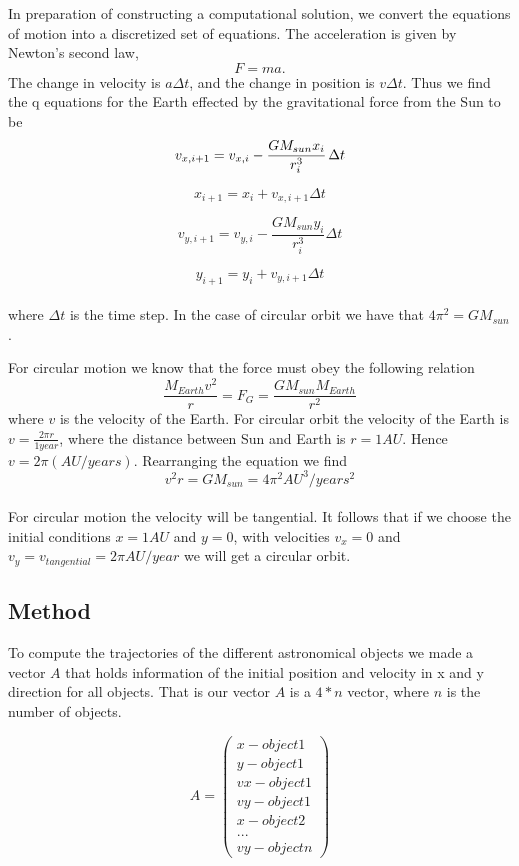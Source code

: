 \documentclass[a4paper,12pt, english]{article}
\begin{document}
In preparation of constructing a computational solution, we convert the equations of motion into a discretized set of equations. The acceleration is given by Newton's second law, $$ F = ma.$$ The change in velocity is $a \Delta t$, and the change in position is $v \Delta t$. Thus we find the q
equations for the Earth effected by the gravitational force from the Sun to be
\\

$$v_{x,i+1} = v_{x,i} - \frac{G M_{sun} x_i}{r_i ^3} \hspace{0.5mm} \Delta t $$ 

$$x_{i+1} = x_i + v_{x,i+1} \Delta t $$

$$v_{y,i+1} = v_{y,i} - \frac{G M_{sun} y_i}{r_i ^3} \Delta t $$

$$y_{i+1} = y_i + v_{y,i+1} \Delta t $$
\\

where $\Delta t$ is the time step. In the case of circular orbit we have that $4 \pi ^2 = GM_{sun}$.

For circular motion we know that the force must obey the following relation \\
$$\frac{M_{Earth}v^2}{r} = F_G = \frac{GM_{sun}M_{Earth}}{r^2}$$ where $v$ is the velocity of the Earth. 
For circular orbit the velocity of the Earth is $v = \frac{2 \pi r}{1 year}$, where the distance between Sun and Earth is $r = 1 AU$. Hence $v = 2 \pi (AU/years)$. Rearranging the equation we find\\
$$v^2r = GM_{sun} = 4 \pi ^2 AU^3/years^2$$
\\
For circular motion the velocity will be tangential. It follows that if we choose the initial conditions $ x = 1 AU $ and $ y = 0$, with velocities $v_x = 0$ and $v_y = v_{tangential} = 2 \pi AU/year$ we will get a circular orbit.  


\subsection*{Method}
To compute the trajectories of the different astronomical objects we made a vector $A$ that holds information of the initial position and velocity in x and y direction for all objects. That is our vector $A$ is a $4*n$ vector, where $n$ is the number of objects.

\[ A = \left( \begin{array}{c}
x - object 1\\
y - object 1\\
vx - object 1\\
vy -object 1\\
x - object 2\\
... \\
vy - object n \end{array} \right)\]   
\end{document}
